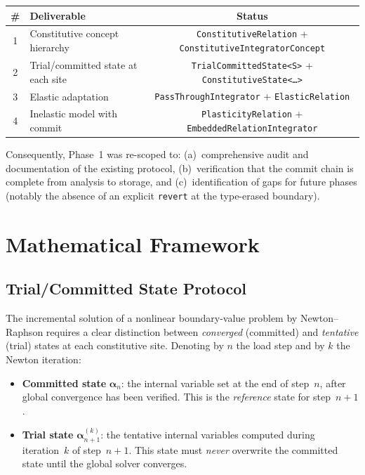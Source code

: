 \begin{center}
\begin{tabular}{clc}
\toprule
\textbf{\#} & \textbf{Deliverable} & \textbf{Status} \\
\midrule
1 & Constitutive concept hierarchy &
    \texttt{ConstitutiveRelation} +
    \texttt{ConstitutiveIntegratorConcept} \\
2 & Trial/committed state at each site &
    \texttt{TrialCommittedState<S>} +
    \texttt{ConstitutiveState<\ldots>} \\
3 & Elastic adaptation &
    \texttt{PassThroughIntegrator} +
    \texttt{ElasticRelation} \\
4 & Inelastic model with commit &
    \texttt{PlasticityRelation} +
    \texttt{EmbeddedRelationIntegrator} \\
\bottomrule
\end{tabular}
\end{center}

Consequently, Phase~1 was re-scoped to:
(a)~comprehensive audit and documentation of the existing protocol,
(b)~verification that the commit chain is complete from analysis to
storage, and
(c)~identification of gaps for future phases (notably the
absence of an explicit \texttt{revert} at the type-erased boundary).

\section{Mathematical Framework}
\label{sec:phase1-mathematics}

\subsection{Trial/Committed State Protocol}

The incremental solution of a nonlinear boundary-value problem by
Newton--Raphson requires a clear distinction between \emph{converged}
(committed) and \emph{tentative} (trial) states at each constitutive
site.  Denoting by $n$ the load step and by $k$ the Newton iteration:

\begin{itemize}
  \item \textbf{Committed state} $\boldsymbol{\alpha}_n$:
        the internal variable set at the end of step~$n$, after global
        convergence has been verified.  This is the \emph{reference}
        state for step~$n+1$.
  \item \textbf{Trial state} $\boldsymbol{\alpha}_{n+1}^{(k)}$:
        the tentative internal variables computed during iteration~$k$
        of step~$n+1$.  This state must \emph{never} overwrite the
        committed state until the global solver converges.
\end{itemize}

